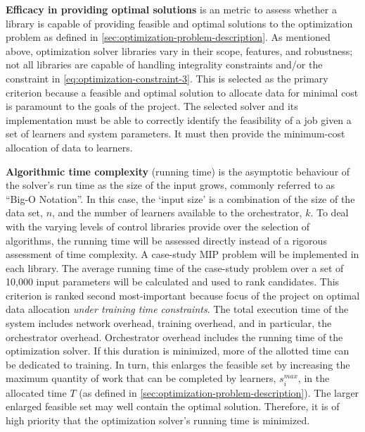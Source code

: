 \documentclass[../mthe-493-final-project.tex]{subfiles}
\begin{document}
    \textbf{Efficacy in providing optimal solutions} is an metric to assess whether a library is capable of providing feasible and optimal solutions to the optimization problem as defined in \autoref{sec:optimization-problem-description}. As mentioned above, optimization solver libraries vary in their scope, features, and robustness; not all libraries are capable of handling integrality constraints and/or the constraint in \eqref{eq:optimization-constraint-3}.
    This is selected as the primary criterion because a feasible and optimal solution to allocate data for minimal cost is paramount to the goals of the project. The selected solver and its implementation must be able to correctly identify the feasibility of a job given a set of learners and system parameters. It must then provide the minimum-cost allocation of data to learners.
    
    \textbf{Algorithmic time complexity} (running time) is the asymptotic behaviour of the solver's run time as the size of the input grows, commonly referred to as ``Big-O Notation''\cite{sipser_introduction_2013}. In this case, the `input size' is a combination of the size of the data set, $n$, and the number of learners available to the orchestrator, $k$. To deal with the varying levels of control libraries provide over the selection of algorithms, the running time will be assessed directly instead of a rigorous assessment of time complexity. A case-study MIP problem will be implemented in each library. The average running time of the case-study problem over a set of 10,000 input parameters will be calculated and used to rank candidates.
    This criterion is ranked second most-important because focus of the project on optimal data allocation \textit{under training time constraints}. The total execution time of the system includes network overhead, training overhead, and in particular, the orchestrator overhead. Orchestrator overhead includes the running time of the optimization solver. If this duration is minimized, more of the allotted time can be dedicated to training. In turn, this enlarges the feasible set by increasing the maximum quantity of work that can be completed by learners, $s^{max}_i$, in the allocated time $T$ (as defined in \autoref{sec:optimization-problem-description}). The larger enlarged feasible set may well contain the optimal solution. Therefore, it is of high priority that the optimization solver's running time is minimized.
    
\end{document}
